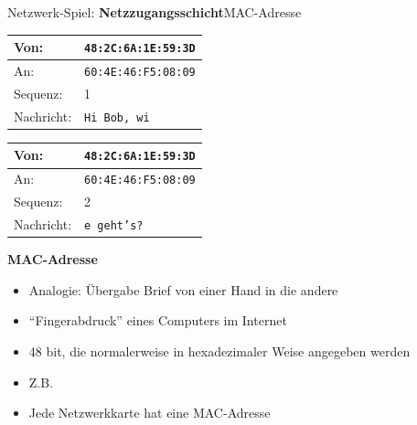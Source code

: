\begin{frame}[fragile]{Netzwerk-Spiel: \textbf{Netzzugangsschicht}}{MAC-Adresse}
    \begin{table}[H]
        \footnotesize
        \centering
        \begin{tabular}{l|l}
            \rowcolor{\dataLinkLayerColor!20} Von:         & \texttt{48:2C:6A:1E:59:3D} \\\midrule
            \rowcolor{\dataLinkLayerColor!20} An:          & \texttt{60:4E:46:F5:08:09} \\\midrule
            \rowcolor{\transportLayerColor!20}Sequenz:     & 1                          \\\midrule
            \rowcolor{\applicationLayerColor!20}Nachricht: & \texttt{Hi Bob, wi}        \\
        \end{tabular}
        \begin{tabular}{l|l}
            \rowcolor{\dataLinkLayerColor!20} Von:         & \texttt{48:2C:6A:1E:59:3D} \\\midrule
            \rowcolor{\dataLinkLayerColor!20} An:          & \texttt{60:4E:46:F5:08:09} \\\midrule
            \rowcolor{\transportLayerColor!20}Sequenz:     & 2                          \\\midrule
            \rowcolor{\applicationLayerColor!20}Nachricht: & \texttt{e geht's?}         \\
        \end{tabular}
    \end{table}
    \faFingerprint{} \textbf{MAC-Adresse}
    \begin{itemize}[<+->]
        \item Analogie: Übergabe Brief von einer Hand in die andere
        \item \enquote{Fingerabdruck} eines Computers im Internet
        \item 48 bit, die normalerweise in hexadezimaler Weise angegeben werden
        \item Z.B. 
        \item Jede Netzwerkkarte hat eine MAC-Adresse
    \end{itemize}
\end{frame}

